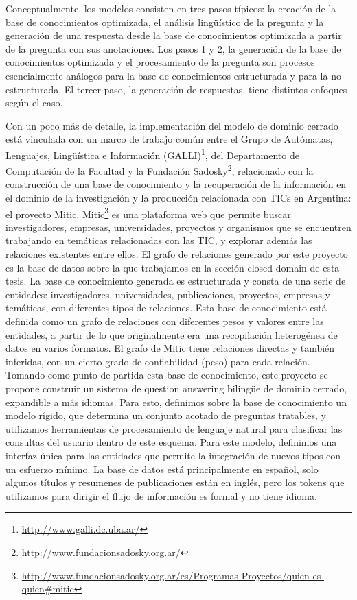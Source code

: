 Conceptualmente, los modelos consisten en tres pasos típicos: la creación de la base de conocimientos optimizada, el análisis
lingüístico de la pregunta y la generación de una respuesta desde la base de conocimientos optimizada a partir de la pregunta con sus
anotaciones. Los pasos 1 y 2, la generación de la base de conocimientos optimizada y el procesamiento de la pregunta son procesos
esencialmente análogos para la base de conocimientos estructurada y para la no estructurada. El tercer paso, la generación de respuestas,
tiene distintos enfoques según el caso. 


Con un poco más de detalle, la implementación del modelo de dominio cerrado está vinculada con un marco de trabajo común entre el Grupo de Autómatas, Lenguajes, Lingüística e Información (GALLI)\footnote{\url{http://www.galli.dc.uba.ar/}}, del Departamento de Computación de la Facultad y la Fundación Sadosky\footnote{\url{http://www.fundacionsadosky.org.ar/}}, relacionado con la construcción de una base de conocimiento y la recuperación de la información en el dominio de la investigación y la producción relacionada con TICs en Argentina: el proyecto Mitic. Mitic\footnote{\url{http://www.fundacionsadosky.org.ar/es/Programas-Proyectos/quien-es-quien\#mitic}} es una plataforma web que permite buscar investigadores, empresas, universidades, proyectos y organismos que se encuentren trabajando en temáticas relacionadas con las TIC, y explorar además las relaciones existentes entre ellos. El grafo de relaciones generado por este proyecto es la base de datos sobre la que trabajamos en la sección closed domain de esta tesis. La base de conocimiento generada es estructurada y consta de una serie de entidades: investigadores, universidades, publicaciones, proyectos, empresas y temáticas, con diferentes tipos de relaciones. Esta base de conocimiento está definida como un grafo de relaciones con diferentes pesos y valores entre las entidades, a partir de lo que originalmente era una recopilación heterogénea de datos en varios formatos. El grafo de Mitic tiene relaciones directas y también inferidas, con un cierto grado de confiabilidad (peso) para cada relación. Tomando como punto de
partida esta base de conocimiento, este proyecto se propone construir un sistema de question answering bilingüe de dominio cerrado, expandible a más idiomas.
Para esto, definimos sobre la base de conocimiento un modelo rígido, que determina un conjunto acotado de preguntas tratables, y utilizamos herramientas de procesamiento de lenguaje natural para clasificar las consultas del usuario dentro de este esquema. Para este modelo, definimos una interfaz única para las entidades que permite la integración de nuevos tipos con un esfuerzo mínimo. La base de datos está principalmente en español, solo algunos títulos y resumenes de publicaciones están en inglés, pero los tokens que utilizamos para dirigir el flujo de información es formal y no tiene idioma.

